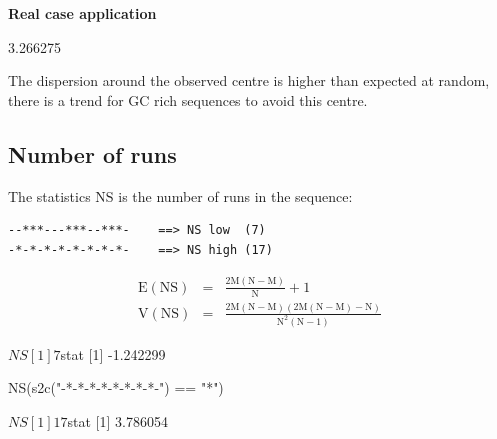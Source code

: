 \documentclass{article}
\begin{document}
\noindent\textbf{Real case application}

\begin{Schunk}
\begin{Soutput}
[1] 3.266275
\end{Soutput}
\end{Schunk}

The dispersion around the observed centre is higher than expected at random, there is a trend for
GC rich sequences to avoid this centre.



\subsection{Number of runs}

The statistics $$ is the number of runs in the sequence:

\begin{verbatim}
--***---***--***-    ==> NS low  (7)
-*-*-*-*-*-*-*-*-    ==> NS high (17)
\end{verbatim}

\begin{eqnarray*}
\mathrm{E(NS)} & = & \mathrm{\frac{2M(N - M)}{N} + 1} \\
\mathrm{V(NS)} & = & \mathrm{\frac{2M(N - M)(2M(N - M) - N)}{N^2(N - 1)}}
\end{eqnarray*}

\begin{Schunk}
\begin{Soutput}
$NS
[1] 7

$stat
[1] -1.242299
\end{Soutput}
\begin{Sinput}
 NS(s2c("-*-*-*-*-*-*-*-*-") == "*")
\end{Sinput}
\begin{Soutput}
$NS
[1] 17

$stat
[1] 3.786054
\end{Soutput}
\end{Schunk}
\end{document}
